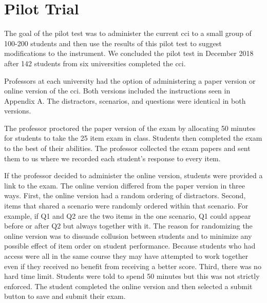 

\begin{table}[!ht]
\centering
\caption{Five Core Concepts of Cybersecurity}
\label{tab:topics}
\end{table}




\FloatBarrier






\section{Pilot Trial}

The goal of the pilot test was to administer the current \gls{cci} to a small group of 100-200 students and then use the results of this pilot test to suggest modifications to the instrument. We concluded the pilot test in December 2018 after 142 students from six universities completed the \gls{cci}.

Professors at each university had the option of administering a paper version or online version of the \gls{cci}. Both versions included the instructions seen in Appendix A. The distractors, scenarios, and questions were identical in both versions. 

The professor proctored the paper version of the exam by allocating 50 minutes for students to take the 25 item exam in class. Students then completed the exam to the best of their abilities. The professor collected the exam papers and sent them to us where we recorded each student's response to every item.  

If the professor decided to administer the online version, students were provided a link to the exam. The online version differed from the paper version in three ways. First, the online version had a random ordering of distractors. Second, items that shared a scenario were randomly ordered within that scenario. For example, if Q1 and Q2 are the two items in the one scenario, Q1 could appear before or after Q2 but always together with it. The reason for randomizing the online version was to dissuade collusion between students and to minimize any possible effect of item order on student performance. Because students who had access were all in the same course they may have attempted to work together even if they received no benefit from receiving a better score. Third, there was no hard time limit. Students were told to spend 50 minutes but this was not strictly enforced. The student completed the online version and then selected a submit button to save and submit their exam.


